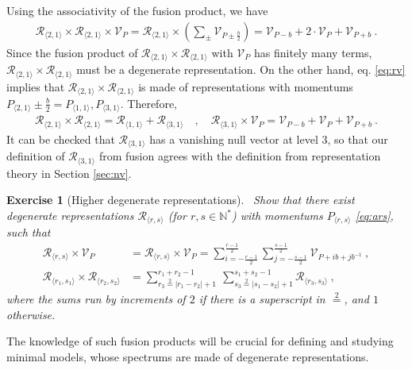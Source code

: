 \documentclass[12pt, a4paper]{article}
\theoremstyle{break}
\newtheorem{exo}{Exercise}[section]
\begin{document}
Using the associativity of the fusion product, we have 
\begin{align}
 \mathcal{R}_{\langle 2,1\rangle}\times \mathcal{R}_{\langle 2,1\rangle}  \times \mathcal V_P  =
\mathcal{R}_{\langle 2,1\rangle}\times  \left(\sum_\pm \mathcal V_{P\pm \frac{b}{2}}\right) =
\mathcal V_{P - b} + 2\cdot \mathcal V_P + \mathcal V_{P + b} \ .
\end{align}
Since the fusion product of $\mathcal{R}_{\langle 2,1\rangle}\times \mathcal{R}_{\langle 2,1\rangle} $ with $\mathcal V_P$ has finitely many terms, $\mathcal{R}_{\langle 2,1\rangle}\times \mathcal{R}_{\langle 2,1\rangle} $
must be a degenerate representation. 
On the other hand, eq. \eqref{eq:rv} implies that $\mathcal{R}_{\langle 2,1\rangle}\times \mathcal{R}_{\langle 2,1\rangle} $ is made of representations with momentums $P_{\langle 2,1\rangle} \pm \frac{b}{2} = P_{\langle 1,1\rangle}, P_{\langle 3,1\rangle}$. Therefore,
\begin{align}
 \mathcal{R}_{\langle 2,1\rangle}\times \mathcal{R}_{\langle 2,1\rangle} = \mathcal{R}_{\langle 1,1\rangle} + \mathcal{R}_{\langle 3,1\rangle} \quad , \quad \mathcal{R}_{\langle 3,1\rangle} \times \mathcal V_P = \mathcal V_{P - b} + \mathcal V_P + \mathcal V_{P + b}\ .
\end{align}
It can be checked that $\mathcal{R}_{\langle 3,1\rangle}$ has a vanishing null vector at level $3$, so that our definition of $\mathcal{R}_{\langle 3,1\rangle}$ from fusion agrees with the definition from representation theory in Section \ref{sec:nv}.

\begin{exo}[Higher degenerate representations]
~\label{exo:hdr}
 Show that there exist degenerate representations $\mathcal{R}_{\langle r,s \rangle}$ (for $r, s \in \mathbb{N}^*$) with momentums $P_{\langle r,s \rangle}$ \eqref{eq:ars},
such that 
 \begin{align}
 \mathcal{R}_{\langle r,s \rangle}\times \mathcal{V}_P &= \mathcal{R}_{\langle r,s \rangle}\times \mathcal{V}_P = \sum_{i=-\frac{r-1}{2}}^{\frac{r-1}{2}} \sum_{j=-\frac{s-1}{2}}^{\frac{s-1}{2}} \mathcal{V}_{P + ib+jb^{-1}}\ ,
\label{rtv}
 \\
 \mathcal{R}_{\langle r_1,s_1 \rangle} \times \mathcal{R}_{\langle r_2,s_2 \rangle} &= \sum_{r_3\overset{2}{=}|r_1-r_2|+1}^{r_1+r_2-1}\ \sum_{s_3\overset{2}{=}|s_1-s_2|+1}^{s_1+s_2-1} \mathcal{R}_{\langle r_3,s_3 \rangle}\ ,
\label{rrsr}
\end{align}
where the sums run by increments of $2$ if there is a superscript in $\overset{2}{=}$, and $1$ otherwise.
\end{exo}
The knowledge of such fusion products will be crucial for defining and studying minimal models, whose spectrums are made of degenerate representations. 
\end{document}
